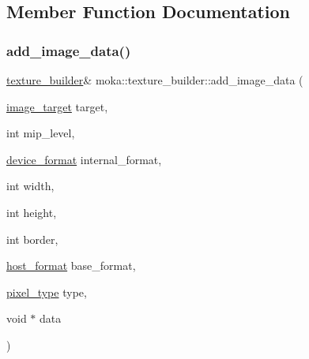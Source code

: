 \subsection{Member Function Documentation}
\mbox{\label{classmoka_1_1texture__builder_ae90b0d4367a36e031d136970805cd311}} 
\subsubsection{\texorpdfstring{add\_image\_data()}{add\_image\_data()}\hspace{0.1cm}{\footnotesize\ttfamily [1/2]}}
{\footnotesize\ttfamily \mbox{\hyperlink{classmoka_1_1texture__builder}{texture\+\_\+builder}}\& moka\+::texture\+\_\+builder\+::add\+\_\+image\+\_\+data (\begin{DoxyParamCaption}\item[{\mbox{\hyperlink{namespacemoka_a6f402ae62a72ce17ff73fa94d526800e}{image\+\_\+target}}}]{target,  }\item[{int}]{mip\+\_\+level,  }\item[{\mbox{\hyperlink{namespacemoka_ac2d188857be60286ff735744a33ebd2d}{device\+\_\+format}}}]{internal\+\_\+format,  }\item[{int}]{width,  }\item[{int}]{height,  }\item[{int}]{border,  }\item[{\mbox{\hyperlink{namespacemoka_a1989c05aecf3bb10bbf8a7027e3df130}{host\+\_\+format}}}]{base\+\_\+format,  }\item[{\mbox{\hyperlink{namespacemoka_a067d388d48715c4e725cd426d5bf3770}{pixel\+\_\+type}}}]{type,  }\item[{void $\ast$}]{data }\end{DoxyParamCaption})}

\mbox{\label{classmoka_1_1texture__builder_ae90b0d4367a36e031d136970805cd311}} 
